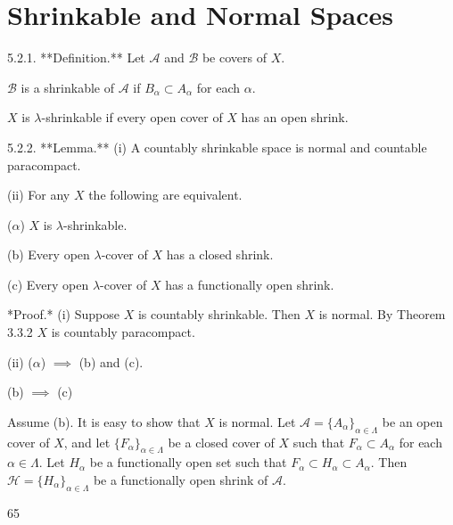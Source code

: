 \documentclass[jisng5i.tex]{subfiles}
\begin{document}
\section{Shrinkable and Normal Spaces} \label{sec:5-2}

5.2.1. **Definition.** Let $\mathcal{A}$ and $\mathcal{B}$ be covers of $X$.

$\mathcal{B}$ is a shrinkable of $\mathcal{A}$ if $B_\alpha \subset A_\alpha$ for each $\alpha$.

$X$ is $\lambda$-shrinkable if every open cover of $X$ has an open shrink.

5.2.2. **Lemma.** (i) A countably shrinkable space is normal and countable paracompact.

(ii) For any $X$ the following are equivalent.

($\alpha$) $X$ is $\lambda$-shrinkable.

(b) Every open $\lambda$-cover of $X$ has a closed shrink.

(c) Every open $\lambda$-cover of $X$ has a functionally open shrink.

*Proof.* (i) Suppose $X$ is countably shrinkable. Then $X$ is normal. By Theorem 3.3.2 $X$ is countably paracompact.

(ii) ($\alpha$) $\implies$ (b) and (c).

(b) $\implies$ (c)

Assume (b). It is easy to show that $X$ is normal. Let $\mathcal{A} = \{A_\alpha\}_{\alpha \in \Lambda}$ be an open cover of $X$, and let $\{F_\alpha\}_{\alpha \in \Lambda}$ be a closed cover of $X$ such that $F_\alpha \subset A_\alpha$ for each $\alpha \in \Lambda$. Let $H_\alpha$ be a functionally open set such that $F_\alpha \subset H_\alpha \subset A_\alpha$. Then $\mathcal{H} = \{H_\alpha\}_{\alpha \in \Lambda}$ be a functionally open shrink of $\mathcal{A}$.

65
\end{document}
